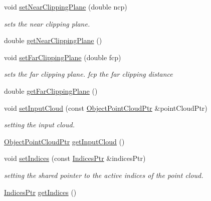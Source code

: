 \begin{DoxyCompactItemize}
void \hyperlink{classnext__best__view_1_1CameraModelFilter_a20e729203ed4a88e23790e42304bb828}{set\-Near\-Clipping\-Plane} (double ncp)
\begin{DoxyCompactList}\small\item\em sets the near clipping plane. \end{DoxyCompactList}\item 
double \hyperlink{classnext__best__view_1_1CameraModelFilter_aeba1bec7a8823193aeee3ff72677efc6}{get\-Near\-Clipping\-Plane} ()
\item 
void \hyperlink{classnext__best__view_1_1CameraModelFilter_a074c3e501dba403e23d8cef29d812088}{set\-Far\-Clipping\-Plane} (double fcp)
\begin{DoxyCompactList}\small\item\em sets the far clipping plane.  fcp the far clipping distance \end{DoxyCompactList}\item 
double \hyperlink{classnext__best__view_1_1CameraModelFilter_a6b6aaa667db199017cb1021c19dfb319}{get\-Far\-Clipping\-Plane} ()
\item 
void \hyperlink{classnext__best__view_1_1CameraModelFilter_a9969d4afc50bcc123426dfa151870a06}{set\-Input\-Cloud} (const \hyperlink{namespacenext__best__view_af8b3b448f67ab117bb7c59bc7c34f0b3}{\-Object\-Point\-Cloud\-Ptr} \&point\-Cloud\-Ptr)
\begin{DoxyCompactList}\small\item\em setting the input cloud. \end{DoxyCompactList}\item 
\hyperlink{namespacenext__best__view_af8b3b448f67ab117bb7c59bc7c34f0b3}{\-Object\-Point\-Cloud\-Ptr} \hyperlink{classnext__best__view_1_1CameraModelFilter_a0806b22fb4cf1a5f193fab114684ce06}{get\-Input\-Cloud} ()
\item 
void \hyperlink{classnext__best__view_1_1CameraModelFilter_ad9569c2d8bd1000e7cc1d220697d90ff}{set\-Indices} (const \hyperlink{namespacenext__best__view_a89edd5f370254b5c7689adfede9fe6a7}{\-Indices\-Ptr} \&indices\-Ptr)
\begin{DoxyCompactList}\small\item\em setting the shared pointer to the active indices of the point cloud. \end{DoxyCompactList}\item 
\hyperlink{namespacenext__best__view_a89edd5f370254b5c7689adfede9fe6a7}{\-Indices\-Ptr} \hyperlink{classnext__best__view_1_1CameraModelFilter_ab49e25f898ac21ccb7d2abfe75dd9445}{get\-Indices} ()
\end{DoxyCompactItemize}
